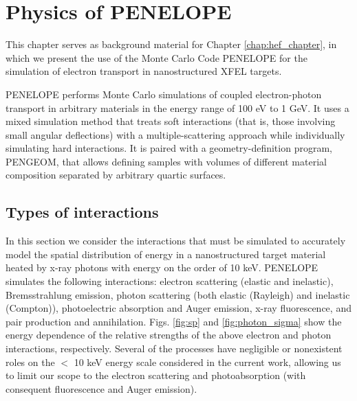 \documentclass [11pt, proquest, article] {uwthesis}[2016/11/22]
\begin{document}
\chapter{Physics of PENELOPE} %
This chapter serves as background material for Chapter \ref{chap:hef_chapter}, in which we present the use of the Monte Carlo Code PENELOPE for the simulation of electron transport in nanostructured XFEL targets.

\label{Penelope} %




PENELOPE performs Monte Carlo simulations of coupled electron-photon transport in arbitrary materials in the energy range of 100 eV to 1 GeV. It uses a mixed simulation method that treats soft interactions (that is, those involving small angular deflections) with a multiple-scattering approach while individually simulating hard interactions. It is paired with a geometry-definition program, PENGEOM, that allows defining samples with volumes of different material composition separated by arbitrary quartic surfaces.

\section{Types of interactions}
In this section we consider the interactions that must be simulated to accurately model the spatial distribution of energy in a nanostructured target material heated by x-ray photons with energy on the order of 10 keV.
PENELOPE simulates the following interactions: electron scattering (elastic and inelastic), Bremsstrahlung emission, photon scattering (both elastic (Rayleigh) and inelastic (Compton)), photoelectric absorption and Auger emission, x-ray fluorescence, and pair production and annihilation. 
Figs. \ref{fig:sp} and \ref{fig:photon_sigma} show the energy dependence of the relative strengths of the above electron and photon interactions, respectively. 
Several of the processes have negligible or nonexistent roles on the $<$ 10 keV energy scale considered in the current work, allowing us to limit our scope to the electron scattering and photoabsorption (with consequent fluorescence and Auger emission).
\end{document}
